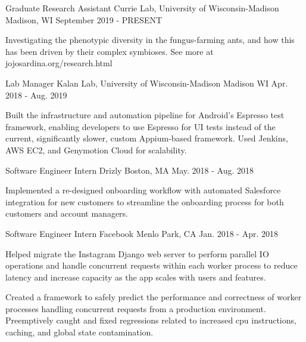 
\begin{cventries}
  \cventry
    {Graduate Research Assistant} %
    {Currie Lab, University of Wisconsin-Madison} %
    {Madison, WI} %
    {September 2019 - PRESENT} %
    {
      \begin{cvitems} %
        \item {Investigating the phenotypic diversity in the fungus-farming ants, and how this has been driven by their complex symbioses. See more at jojosardina.org/research.html}
      \end{cvitems}
    }

  \cventry
    {Lab Manager} %
    {Kalan Lab, University of Wisconsin-Madison} %
    {Madison WI} %
    {Apr. 2018 - Aug. 2019} %
    {
      \begin{cvitems} %
        \item {Built the infrastructure and automation pipeline for Android's Espresso test framework, enabling developers to use Espresso for UI tests instead of the current, significantly slower, custom Appium-based framework. Used Jenkins, AWS EC2, and Genymotion Cloud for scalability.}
      \end{cvitems}
    }

  \cventry
    {Software Engineer Intern} %
    {Drizly} %
    {Boston, MA} %
    {May. 2018 - Aug. 2018} %
    {
      \begin{cvitems} %
        \item {Implemented a re-designed onboarding workflow with automated Salesforce integration for new customers to streamline the onboarding process for both customers and account managers.}
      \end{cvitems}
    }

  \cventry
    {Software Engineer Intern} %
    {Facebook} %
    {Menlo Park, CA} %
    {Jan. 2018 - Apr. 2018} %
    {
      \begin{cvitems} %
        \item {Helped migrate the Instagram Django web server to perform parallel IO operations and handle concurrent requests within each worker process to reduce latency and increase capacity as the app scales with users and features.}
		\item {Created a framework to safely predict the performance and correctness of worker processes handling concurrent requests from a production environment. Preemptively caught and fixed regressions related to increased cpu instructions, caching, and global state contamination.}
      \end{cvitems}
    }


\end{cventries}
